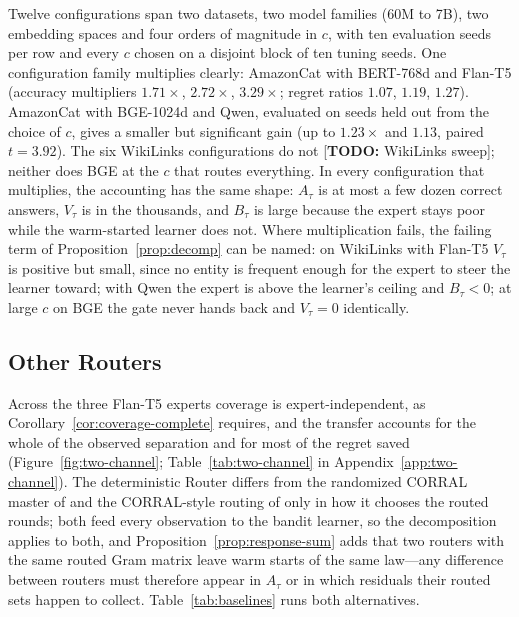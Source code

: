 \documentclass{article}
\theoremstyle{definition}
\theoremstyle{remark}
\theoremstyle{remark}
\newcommand{\todo}[1]{\textcolor{red!70!black}{[\textbf{TODO:} #1]}}
\begin{document}
Twelve configurations span two datasets, two model families (60M to 7B), two
embedding spaces and four orders of magnitude in $c$, with ten evaluation
seeds per row and every $c$ chosen on a disjoint block of ten tuning seeds. One configuration family
multiplies clearly: AmazonCat with BERT-768d and Flan-T5 (accuracy multipliers
$1.71\times$, $2.72\times$, $3.29\times$; regret ratios $1.07$, $1.19$,
$1.27$). AmazonCat with BGE-1024d and Qwen, evaluated on seeds held out from
the choice of $c$, gives a smaller but significant gain (up to $1.23\times$ and
$1.13$, paired $t=3.92$). The six WikiLinks configurations do not \todo{WikiLinks sweep};
neither does BGE at the $c$ that routes everything. In every configuration
that multiplies, the accounting has the same shape: $A_\tau$ is at most a few
dozen correct answers, $V_\tau$ is in the thousands, and $B_\tau$ is large because the expert stays poor while the
warm-started learner does not. Where multiplication fails, the failing term of
Proposition~\ref{prop:decomp} can be named: on WikiLinks with Flan-T5
$V_\tau$ is positive but small, since no entity is frequent enough for the
expert to steer the learner toward; with Qwen the expert is above the learner's ceiling and $B_\tau<0$;
at large $c$ on BGE the gate never hands back and $V_\tau=0$ identically.

\subsection{Other Routers}
\label{app:routers}

Across the three Flan-T5 experts coverage is
expert-independent, as Corollary~\ref{cor:coverage-complete} requires, and the
transfer accounts for the whole of the observed separation and for most of the
regret saved (Figure~\ref{fig:two-channel}; Table~\ref{tab:two-channel} in
Appendix~\ref{app:two-channel}). The deterministic Router differs from the
randomized CORRAL master of \cite{agarwal2017corralling} and the CORRAL-style
routing of \cite{chen2024llmdecision} only in how it chooses the routed
rounds; both feed every observation to the bandit learner, so the
decomposition applies to both, and Proposition~\ref{prop:response-sum} adds
that two routers with the same routed Gram matrix leave warm starts of the
same law---any difference between routers must therefore appear in $A_\tau$ or
in which residuals their routed sets happen to collect.
Table~\ref{tab:baselines} runs both alternatives.
\end{document}
